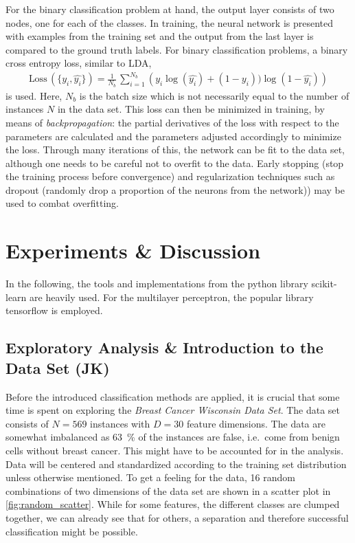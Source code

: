 \documentclass[12pt, a4paper]{scrartcl}
\begin{document}
For the binary classification problem at hand, the output layer consists of two nodes, one for each of the classes. In training, the neural network is presented with examples from the training set and the output from the last layer is compared to the ground truth labels. For binary classification problems, a binary cross entropy loss, similar to LDA,
\begin{align}
	\text{Loss}\, (\{y_i, \hat{y_i}\}) = \frac{1}{N_b} \, \sum_{i=1}^{N_b} \left( y_i \log(\hat{y_i}) + (1-y_i)) \log(1-\hat{y_i}) \right)
\end{align}
is used. Here, $N_b$ is the batch size which is not necessarily equal to the number of instances $N$ in the data set. This loss can then be minimized in training, by means of \emph{backpropagation}: the partial derivatives of the loss with respect to the parameters are calculated and the parameters adjusted accordingly to minimize the loss.
Through many iterations of this, the network can be fit to the data set, although one needs to be careful not to overfit to the data.
Early stopping (stop the training process before convergence) and regularization techniques such as dropout (randomly drop a proportion of the neurons from the network)) may be used to combat overfitting.

\section{Experiments \& Discussion}
\label{sec:expe}
In the following, the tools and implementations from the python library scikit-learn \cite{scikit-learn} are heavily used. For the multilayer perceptron, the popular library tensorflow \cite{tensorflow2015-whitepaper} is employed.

\subsection{Exploratory Analysis \& Introduction to the Data Set (JK)}
Before the introduced classification methods are applied, it is crucial that some time is spent on exploring the \emph{Breast Cancer Wisconsin Data Set}.
The data set consists of $N=569$ instances with $D=30$ feature dimensions. The data are somewhat imbalanced as \SI{63}{\percent} of the instances are false, i.e.\  come from benign cells without breast cancer. This might have to be accounted for in the analysis.
Data will be centered and standardized according to the training set distribution unless otherwise mentioned.
To get a feeling for the data, 16 random combinations of two dimensions of the data set are shown in a scatter plot in \cref{fig:random_scatter}. While for some features, the different classes are clumped together, we can already see that for others, a separation and therefore successful classification might be possible.
\end{document}
